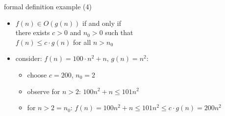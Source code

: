 \begin{frame}{formal definition example (4)}
    \begin{itemize}
    \item $f(n) \in O(g(n))$ if and only if \\
        \hspace{.5cm}there exists $c > 0$ and $n_0 > 0$ such that \\
        \hspace{.5cm}$f(n) \le c \cdot g(n)$ for all $n > n_0$
    \item consider: $f(n) = 100\cdot n^2 + n$, $g(n) = n^2$:
        \begin{itemize}
        \item choose $c = 200$, $n_0 = 2$
        \item observe for $n > 2$: $100n^2 + n \le 101n^2$
        \item for $n > 2=n_0$: $f(n) = 100n^2 + n \le 101n^2 \le c\cdot g(n) = 200n^2$
        \end{itemize}
    \end{itemize}
\end{frame}

